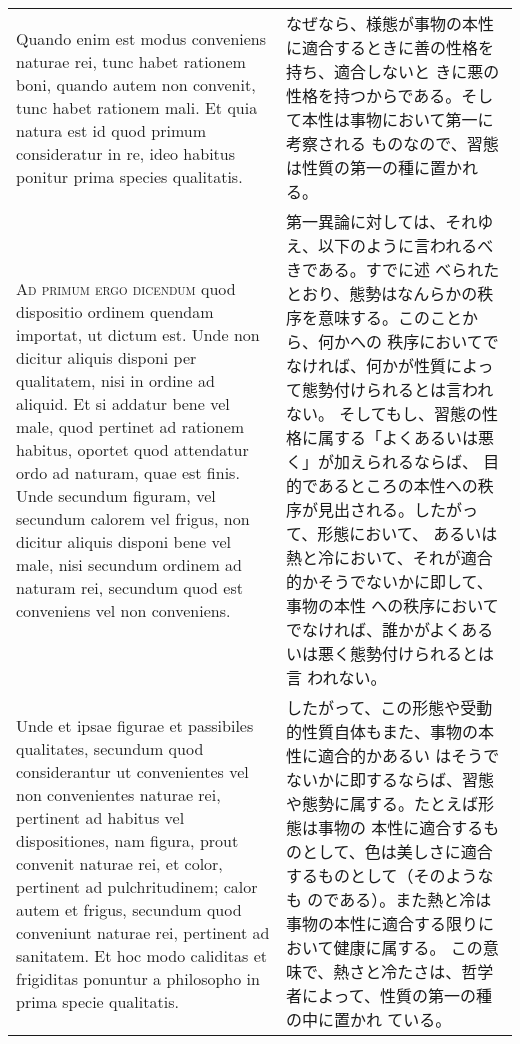\documentclass[10pt]{jsarticle} %
\begin{document}
\begin{longtable}{p{21em}p{21em}}
\\


Quando enim est modus conveniens
naturae rei, tunc habet rationem boni, quando autem non convenit, tunc
habet rationem mali. Et quia natura est id quod primum consideratur in
re, ideo habitus ponitur prima species qualitatis.

&

なぜなら、様態が事物の本性に適合するときに善の性格を持ち、適合しないと
きに悪の性格を持つからである。そして本性は事物において第一に考察される
ものなので、習態は性質の第一の種に置かれる。

\\



{\scshape Ad primum ergo dicendum} quod dispositio ordinem quendam importat, ut
dictum est. Unde non dicitur aliquis disponi per qualitatem, nisi in
ordine ad aliquid. Et si addatur bene vel male, quod pertinet ad
rationem habitus, oportet quod attendatur ordo ad naturam, quae est
finis. Unde secundum figuram, vel secundum calorem vel frigus, non
dicitur aliquis disponi bene vel male, nisi secundum ordinem ad
naturam rei, secundum quod est conveniens vel non conveniens. 


&

第一異論に対しては、それゆえ、以下のように言われるべきである。すでに述
べられたとおり、態勢はなんらかの秩序を意味する。このことから、何かへの
秩序においてでなければ、何かが性質によって態勢付けられるとは言われない。
そしてもし、習態の性格に属する「よくあるいは悪く」が加えられるならば、
目的であるところの本性への秩序が見出される。したがって、形態において、
あるいは熱と冷において、それが適合的かそうでないかに即して、事物の本性
への秩序においてでなければ、誰かがよくあるいは悪く態勢付けられるとは言
われない。


\\


Unde et
ipsae figurae et passibiles qualitates, secundum quod considerantur ut
convenientes vel non convenientes naturae rei, pertinent ad habitus
vel dispositiones, nam figura, prout convenit naturae rei, et color,
pertinent ad pulchritudinem; calor autem et frigus, secundum quod
conveniunt naturae rei, pertinent ad sanitatem. Et hoc modo caliditas
et frigiditas ponuntur a philosopho in prima specie qualitatis.

&

したがって、この形態や受動的性質自体もまた、事物の本性に適合的かあるい
はそうでないかに即するならば、習態や態勢に属する。たとえば形態は事物の
本性に適合するものとして、色は美しさに適合するものとして（そのようなも
のである）。また熱と冷は事物の本性に適合する限りにおいて健康に属する。
この意味で、熱さと冷たさは、哲学者によって、性質の第一の種の中に置かれ
ている。


\end{longtable}
\end{document}
